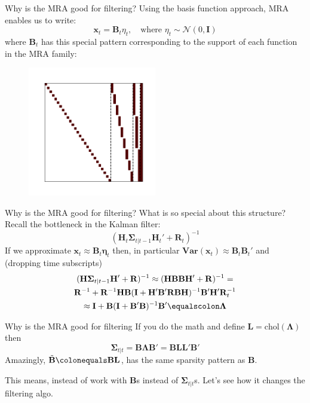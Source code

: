 \documentclass{beamer}
\newcommand{\bx}{\mathbf{x}}
\newcommand{\bL}{\mathbf{L}}
\newcommand{\bI}{\mathbf{I}}
\newcommand{\bH}{\mathbf{H}}
\newcommand{\bB}{\mathbf{B}}
\newcommand{\bR}{\mathbf{R}}
\newcommand{\bfeta}{\bm{\eta}}
\newcommand{\bfSigma}{\bm{\Sigma}}
\newcommand{\bfLambda}{\bm{\Lambda}}
\newcommand{\normal}{\mathcal{N}}
\newcommand{\var}{\textbf{Var}}
\begin{document}
\begin{frame}{Why is the MRA good for filtering?}
    Using the basis function approach, MRA enables us to write:
    $$
    \bx_t = \bB_t \eta_t, \quad \text{where } \eta_t \sim \normal(0, \bI)
    $$
    where $\bB_t$ has this special pattern corresponding to the support of each function in the MRA family:
    \begin{figure}
        \centering
        \includegraphics[width=0.5\textwidth]{plots/B.png}
    \end{figure}
\end{frame}


\begin{frame}{Why is the MRA good for filtering?}
    What is so special about this structure? Recall the bottleneck in the Kalman filter:
    $$
    (\bH_t\bfSigma_{t|t-1} \bH_t'+\bR_t)^{-1}
    $$
    If we approximate $\bx_t \approx \bB_t\bfeta_t$ then, in particular $\var(\bx_t) \approx \bB_t\bB_t'$ and (dropping time subscripts)
    \begin{multline*}
    (\bH\bfSigma_{t|t-1} \bH'+\bR)^{-1} \approx (\bH\bB\bB \bH'+\bR)^{-1} = \\
    \bR^{-1} + \bR^{-1}\bH\bB(\bI + \bH'\bB'\bR\bB\bH)^{-1}\bB'\bH'\bR_t^{-1} \\ \approx 
    \bI + \bB(\bI + \bB'\bB)^{-1}\bB' \equalscolon\bfLambda
    \end{multline*}
\end{frame}

\begin{frame}{Why is the MRA good for filtering}
    If you do the math and define $\bL = \text{chol}(\bfLambda)$ then 
    $$
    \bfSigma_{t|t} = \bB\bfLambda\bB' = \bB\bL\bL'\bB' 
    $$
    Amazingly, $\tilde{\bB} \colonequals \bB\bL$, has the same sparsity pattern as $\bB$.
    
    \vspace{1cm}
    This means, instead of work with $\bB$s instead of $\bfSigma_{t|t}$s.
    \vfill
    Let's see how it changes the filtering algo.
\end{frame}
\end{document}
